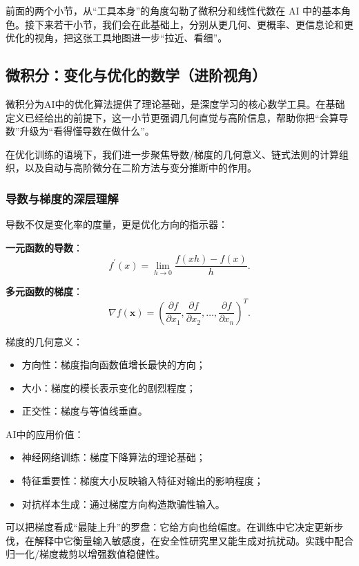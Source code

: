 \begin{itemize}
前面的两个小节，从“工具本身”的角度勾勒了微积分和线性代数在 AI 中的基本角色。接下来若干小节，我们会在此基础上，分别从更几何、更概率、更信息论和更优化的视角，把这张工具地图进一步“拉近、看细”。

\subsection{微积分：变化与优化的数学（进阶视角）}

微积分为AI中的优化算法提供了理论基础，是深度学习的核心数学工具。在基础定义已经给出的前提下，这一小节更强调几何直觉与高阶信息，帮助你把“会算导数”升级为“看得懂导数在做什么”。

在优化训练的语境下，我们进一步聚焦导数/梯度的几何意义、链式法则的计算组织，以及自动与高阶微分在二阶方法与变分推断中的作用。

\subsubsection{导数与梯度的深层理解}

导数不仅是变化率的度量，更是优化方向的指示器：

\textbf{一元函数的导数}：
$$f^\prime (x) = \lim_{h \to 0} \frac{f(xh) - f(x)}{h}.$$

\textbf{多元函数的梯度}：
$$\nabla f(\mathbf{x}) = \left(\frac{\partial f}{\partial x_1}, \frac{\partial f}{\partial x_2}, \ldots, \frac{\partial f}{\partial x_n}\right)^T.$$

梯度的几何意义：
\begin{itemize}
  \item 方向性：梯度指向函数值增长最快的方向；
  \item 大小：梯度的模长表示变化的剧烈程度；
  \item 正交性：梯度与等值线垂直。
\end{itemize}
 
AI中的应用价值：
\begin{itemize}
  \item 神经网络训练：梯度下降算法的理论基础；
  \item 特征重要性：梯度大小反映输入特征对输出的影响程度；
  \item 对抗样本生成：通过梯度方向构造欺骗性输入。
\end{itemize}

可以把梯度看成“最陡上升”的罗盘：它给方向也给幅度。在训练中它决定更新步伐，在解释中它衡量输入敏感度，在安全性研究里又能生成对抗扰动。实践中配合归一化/梯度裁剪以增强数值稳健性。


\end{itemize}
